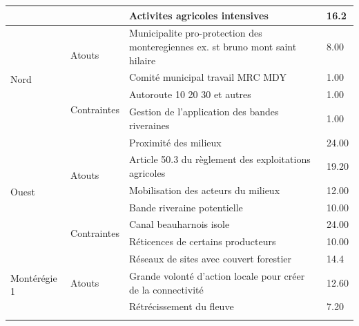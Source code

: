 \begin{table}[]
\begin{tabular}{m{}lm{}l}
                        &                              & Activites agricoles intensives                               & 16.2           \\ \hline
\multirow{4}{*}{Nord}         & \multirow{2}{*}{Atouts}      & Municipalite pro-protection des monteregiennes ex. st bruno mont saint hilaire & 8.00  \\ \cline{3-4} 
                        &                              & Comité municipal travail MRC MDY                             & 1.00           \\ \cline{2-4} 
                        & \multirow{2}{*}{Contraintes} & Autoroute 10 20 30 et autres                                 & 1.00           \\ \cline{3-4} 
                        &                              & Gestion de l'application des bandes riveraines               & 1.00           \\ \hline
\multirow{6}{*}{Ouest}  & \multirow{4}{*}{Atouts}      & Proximité des milieux                                        & 24.00          \\ \cline{3-4} 
                        &                              & Article 50.3 du règlement des exploitations agricoles        & 19.20          \\ \cline{3-4} 
                        &                              & Mobilisation des acteurs du milieux                          & 12.00          \\ \cline{3-4} 
                        &                              & Bande riveraine potentielle                                  & 10.00          \\ \cline{2-4} 
                        & \multirow{2}{*}{Contraintes} & Canal beauharnois isole                                      & 24.00          \\ \cline{3-4} 
                        &                              & Réticences de certains producteurs                           & 10.00          \\ \hline
\multirow{5}{*}{Montérégie 1} & \multirow{3}{*}{Atouts}      & Réseaux de sites avec couvert forestier                                        & 14.4  \\ \cline{3-4} 
                        &                              & Grande volonté d'action locale pour créer de la connectivité & 12.60          \\ \cline{3-4} 
                        &                              & Rétrécissement du fleuve                                     & 7.20           \\ \cline{2-4} 

\end{tabular}
\end{table}
